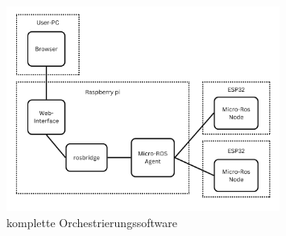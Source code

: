 \begin{flushleft}

    \begin{figure}[h!]
        \centering
        \includegraphics[width=0.8\textwidth]{imgs/Full_system_graph.png}
        \caption{komplette Orchestrierungssoftware}
        \label{fig:orchestration_system}%
    \end{figure}

\end{flushleft}